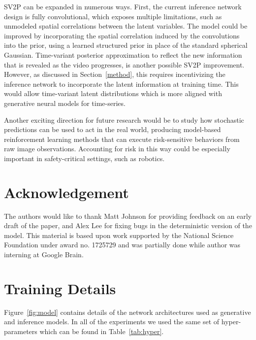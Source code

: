 \documentclass{article} \usepackage{iclr2018_conference,times}
\begin{document}
SV2P can be expanded in numerous ways. First, the current inference network design is fully convolutional, which exposes multiple limitations, such as unmodeled spatial correlations between the latent variables.
The model could be improved by incorporating the spatial correlation induced by the convolutions into the prior, using a learned structured prior in place of the standard spherical Gaussian. 
Time-variant posterior approximation to reflect the new information that is revealed as the video progresses, is another possible SV2P improvement. However, as discussed in Section~\ref{method}, this requires incentivizing the inference network to incorporate the latent information at training time. This would allow time-variant latent distributions which is more aligned with generative neural models for time-series\citep{johnson2016composing,gao2016linear,krishnan2017structured}. 





Another exciting direction for future research would be to study how stochastic predictions can be used to act in the real world, producing model-based reinforcement learning methods that can execute risk-sensitive behaviors from raw image observations. Accounting for risk in this way could be especially important in safety-critical settings, such as robotics.
 
\section*{Acknowledgement}
The authors would like to thank Matt Johnson for providing feedback on an early draft of the paper, and Alex Lee for fixing bugs in the deterministic version of the model. This material is based upon work supported by the National Science Foundation under award no. 1725729 and  was partially done while author was interning at Google Brain. 








\newpage
\appendix
\section{Training Details}
Figure~\ref{fig:model} contains details of the network architectures used as generative and inference models. In all of the experiments we used the same set of hyper-parameters which can be found in Table~\ref{tab:hyper}.
\end{document}

